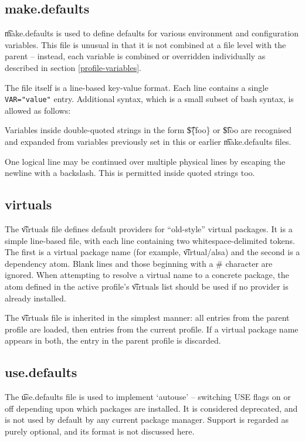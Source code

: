 \subsection{make.defaults}
\t{make.defaults} is used to define defaults for various environment and configuration variables.
This file is unusual in that it is not combined at a file level with the parent -- instead, each
variable is combined or overridden individually as described in section \ref{profile-variables}.

The file itself is a line-based key-value format. Each line contains a single \verb|VAR="value"|
entry. Additional syntax, which is a small subset of bash syntax, is allowed as follows:

\begin{bulletlist}
\item Variables inside double-quoted strings in the form \t{\$\{foo\}} or \t{\$foo} are recognised and
  expanded from variables previously set in this or earlier \t{make.defaults} files.
\item One logical line may be continued over multiple physical lines by escaping the newline with a
  backslash. This is permitted inside quoted strings too.
\end{bulletlist}

\subsection{virtuals}
\label{profiles-virtuals}
The \t{virtuals} file defines default providers for ``old-style'' virtual packages. It is a simple
line-based file, with each line containing two whitespace-delimited tokens. The first is a virtual
package name (for example, \t{virtual/alsa}) and the second is a dependency atom. Blank lines and
those beginning with a \# character are ignored. When attempting to resolve a virtual name to a
concrete package, the atom defined in the active profile's \t{virtuals} list should be used if no
provider is already installed.

The \t{virtuals} file is inherited in the simplest manner: all entries from the parent profile are
loaded, then entries from the current profile. If a virtual package name appears in both, the entry
in the parent profile is discarded.

\subsection{use.defaults}
The \t{use.defaults} file is used to implement `autouse' -- switching USE flags on or off depending
upon which packages are installed. It is considered deprecated, and is not used by default by any
current package manager. Support is regarded as purely optional, and its format is not discussed
here.

